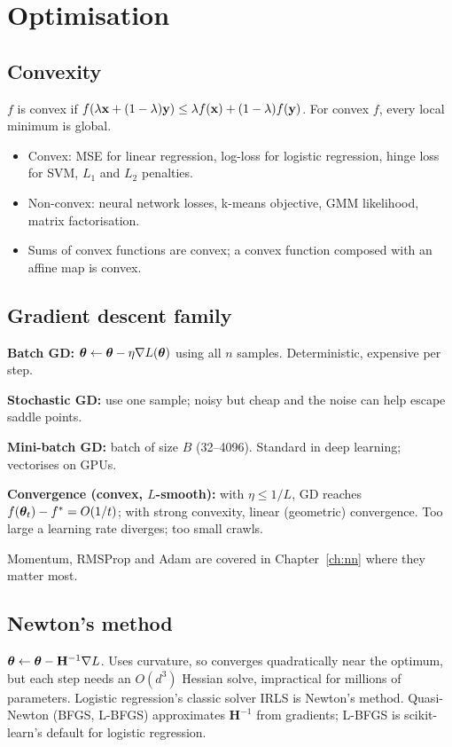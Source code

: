 \section{Optimisation}

\subsection{Convexity}
$f$ is convex if $f(\lambda\mathbf{x}+(1-\lambda)\mathbf{y})\le\lambda f(\mathbf{x})+(1-\lambda)f(\mathbf{y})$. For convex $f$, every local minimum is global.
\begin{itemize}
  \item Convex: MSE for linear regression, log-loss for logistic regression, hinge loss for SVM, $L_1$ and $L_2$ penalties.
  \item Non-convex: neural network losses, k-means objective, GMM likelihood, matrix factorisation.
  \item Sums of convex functions are convex; a convex function composed with an affine map is convex.
\end{itemize}

\subsection{Gradient descent family}
\textbf{Batch GD:} $\bm{\theta}\leftarrow\bm{\theta}-\eta\nabla L(\bm{\theta})$ using all $n$ samples. Deterministic, expensive per step.

\textbf{Stochastic GD:} use one sample; noisy but cheap and the noise can help escape saddle points.

\textbf{Mini-batch GD:} batch of size $B$ (32--4096). Standard in deep learning; vectorises on GPUs.

\textbf{Convergence (convex, $L$-smooth):} with $\eta\le1/L$, GD reaches $f(\bm{\theta}_t)-f^*=O(1/t)$; with strong convexity, linear (geometric) convergence. Too large a learning rate diverges; too small crawls.

Momentum, RMSProp and Adam are covered in Chapter~\ref{ch:nn} where they matter most.

\subsection{Newton's method}
$\bm{\theta}\leftarrow\bm{\theta}-\mathbf{H}^{-1}\nabla L$. Uses curvature, so converges quadratically near the optimum, but each step needs an $O(d^3)$ Hessian solve, impractical for millions of parameters. Logistic regression's classic solver IRLS is Newton's method. Quasi-Newton (BFGS, L-BFGS) approximates $\mathbf{H}^{-1}$ from gradients; L-BFGS is scikit-learn's default for logistic regression.

